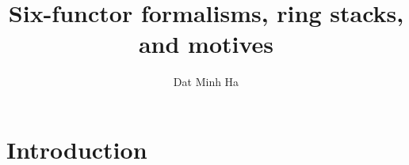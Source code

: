 

\setcounter{section}{-1}





    \title{Six-functor formalisms, ring stacks, and motives}
    
    \author{Dat Minh Ha}
    \maketitle
    
    \begin{abstract}
        
    \end{abstract}
    
    {
      \hypersetup{} 
      \tableofcontents %
    }

    \section{Introduction}

    

    
    
    \printbibliography

